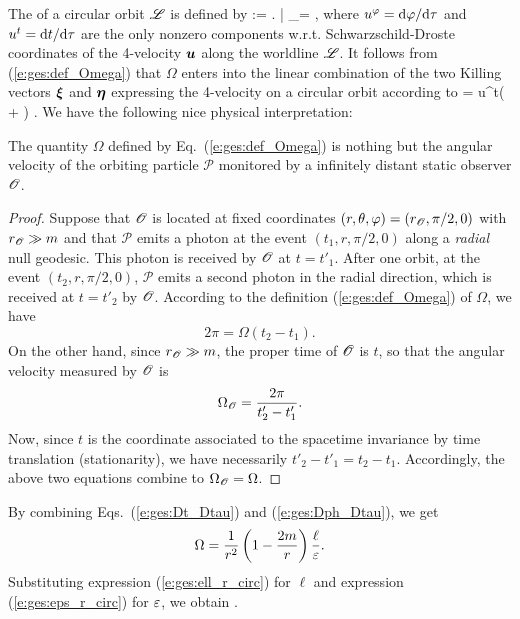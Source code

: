 The  of a circular orbit $\mathscr{L}$ is defined by
\be \label{e:ges:def_Omega}
    \Omega := \left.  \right| _\Li =  ,
\ee
where $u^\varphi = \mathrm{d}\varphi/\mathrm{d}\tau$ and $u^t = \mathrm{d} t/\mathrm{d}\tau$ are the only
nonzero components w.r.t. Schwarzschild-Droste coordinates
of the 4-velocity $\bm{u}$ along the worldline
$\mathscr{L}$. It follows from (\ref{e:ges:def_Omega}) that
$\Omega$ enters into the linear combination of the two Killing
vectors $\bm{\xi}$ and $\bm{\eta}$ expressing the 4-velocity on a circular
orbit according to
\be
     = u^t\left( \w{\xi} + \Omega \w{\eta} \right) .
\ee
We have the following nice physical interpretation:
\begin{greybox}
The quantity $\Omega$ defined by Eq.~(\ref{e:ges:def_Omega}) is nothing but
the angular velocity of the orbiting particle $\mathscr{P}$ monitored by a infinitely
distant static observer $\mathscr{O}$.
\end{greybox}
\begin{proof}
Suppose that $\mathscr{O}$ is located at fixed coordinates
$(r,\theta,\varphi)=(r_{\mathscr{O}},\pi/2,0)$ with $r_{\mathscr{O}}\gg m$ and that
$\mathscr{P}$ emits a photon at the event
$(t_1, r, \pi/2, 0)$ along a \emph{radial} null geodesic. This photon is received
by $\mathscr{O}$ at $t=t'_1$. After one orbit, at the event $(t_2, r, \pi/2, 0)$,
$\mathscr{P}$ emits a second photon in the radial direction, which is received
at $t=t'_2$ by $\mathscr{O}$. According to the definition (\ref{e:ges:def_Omega})
of $\Omega$, we have
\[
    2\pi = \Omega(t_2 - t_1) .
\]
On the other hand, since $r_{\mathscr{O}}\gg m$, the proper time of $\mathscr{O}$ is $t$, so that the
angular velocity measured by $\mathscr{O}$ is
\[
    \Omega_{\mathscr{O}} = \frac{2\pi}{t'_2 - t'_1} .
\]
Now, since $t$ is the coordinate associated to
the spacetime invariance by time translation (stationarity), we have
necessarily $t'_2 - t'_1 = t_2 - t_1$. Accordingly, the above two equations
combine to $\Omega_{\mathscr{O}} = \Omega$.
\end{proof}

By combining Eqs.~(\ref{e:ges:Dt_Dtau}) and (\ref{e:ges:Dph_Dtau}), we get
\[
    \Omega = \frac{1}{r^2} \left( 1 -\frac{2m}{r} \right) \frac{\ell}{\varepsilon} .
\]
Substituting expression (\ref{e:ges:ell_r_circ}) for $\ell$ and
expression (\ref{e:ges:eps_r_circ}) for $\varepsilon$, we obtain
\be \label{e:ges:Omega_m_r}
     .
\ee

